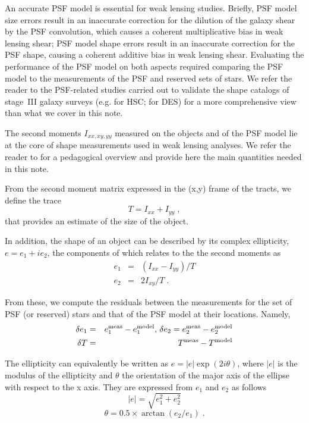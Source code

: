 \documentclass[SE,lsstdraft,authoryear,toc]{lsstdoc}
\begin{document}
An accurate PSF model is essential for weak lensing studies. Briefly, PSF model size errors result in an inaccurate correction for the dilution of the galaxy shear by the PSF convolution, which causes a coherent multiplicative bias in weak lensing shear; PSF model shape errors result in an inaccurate correction for the PSF shape, causing a coherent additive bias in weak lensing shear. Evaluating the performance of the PSF model on both aspects required comparing the PSF model to the measurements of the PSF and reserved sets of stars. We refer the reader to the PSF-related studies carried out to validate the shape catalogs of stage~III galaxy surveys (e.g. \citealp{2018PASJ...70S..25M, 2022PASJ...74..421L} for HSC; \citealp{2016MNRAS.460.2245J, 2018MNRAS.481.1149Z, 2021MNRAS.504.4312G} for DES) for a more comprehensive view than what we cover in this note.

The second moments $I_{xx,xy,yy}$ measured on the objects and of the PSF model lie at the core of shape measurements used in weak lensing analyses. We refer the reader to \citet{2014ApJS..212....5M} for a pedagogical overview and provide here the main quantities needed in this note.   

From the second moment matrix expressed in the (x,y) frame of the tracts, we define the trace 
\begin{equation}
T = I_{xx} + I_{yy}\;,
\end{equation}
that provides an estimate of the size of the object.

In addition, the shape of an object can be described by its complex ellipticity, $e=e_1+i e_2$, the components of which relates to the the second moments as
\begin{eqnarray}
  e_1 &=& (I_{xx} - I_{yy})/T \\
  e_2 &=& 2 I_{xy} / T\;.
\end{eqnarray}

From these, we compute the residuals between the measurements for the set of PSF (or reserved) stars and that of the PSF model at their locations.  Namely,
\begin{eqnarray}
\delta e_1 &=& e_1^{\rm meas} - e_1^{\rm model}, \, \delta e_2 = e_2^{\rm meas} - e_2^{\rm model}\\
\delta T &=& T^{\rm meas} - T^{\rm model} 
\end{eqnarray}

The ellipticity can equivalently be written as $e = |e| \exp(2i\theta)$, where $|e|$ is the modulus of the ellipticity and $\theta$ the orientation of the major axis of the ellipse with respect to the x axis. They are expressed from $e_1$ and $e_2$ as follows
\begin{equation} 
|e| = \sqrt{e_1^2 + e_2^2}
\label{eq:modulus}
\end{equation}
\begin{equation}
\theta = 0.5 \times \arctan(e_2/e_1)\;.
\label{eq:theta}
\end{equation}
\end{document}
